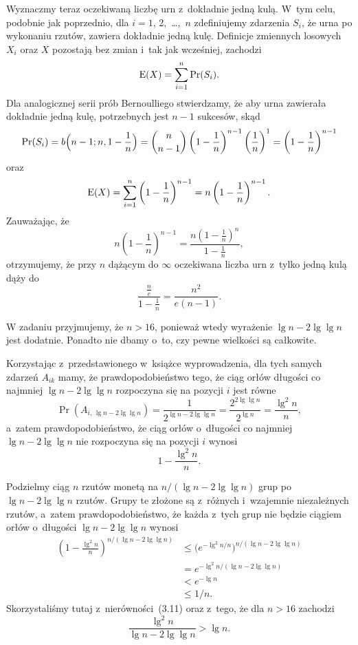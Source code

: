 Wyznaczmy teraz oczekiwaną liczbę urn z~dokładnie jedną kulą. W~tym celu, podobnie jak poprzednio, dla $i=1$, 2,~\dots,~$n$ zdefiniujemy zdarzenia $S_i$, że  urna po wykonaniu rzutów, zawiera dokładnie jedną kulę. Definicje zmiennych losowych $X_i$ oraz $X$ pozostają bez zmian i~tak jak wcześniej, zachodzi
\[
	\operatorname{E}(X) = \sum_{i=1}^n\Pr(S_i).
\]
Dla analogicznej serii prób Bernoulliego stwierdzamy, że aby  urna zawierała dokładnie jedną kulę, potrzebnych jest $n-1$ sukcesów, skąd
\[
	\Pr(S_i) = b\Bigl(n-1;n,1-\frac{1}{n}\Bigr) = \binom{n}{n-1}\left(1-\frac{1}{n}\right)^{n-1}\left(\frac{1}{n}\right)^1 = \left(1-\frac{1}{n}\right)^{n-1}
\]
oraz
\[
	\operatorname{E}(X) = \sum_{i=1}^n\left(1-\frac{1}{n}\right)^{n-1} = n\left(1-\frac{1}{n}\right)^{n-1}.
\]
Zauważając, że
\[
	n\left(1-\frac{1}{n}\right)^{n-1} = \frac{n\left(1-\frac{1}{n}\right)^n}{1-\frac{1}{n}},
\]
otrzymujemy, że przy $n$ dążącym do $\infty$ oczekiwana liczba urn z~tylko jedną kulą dąży do
\[
	\frac{\frac{n}{e}}{1-\frac{1}{n}} = \frac{n^2}{e(n-1)}.
\]

\exercise %
W zadaniu przyjmujemy, że $n>16$, ponieważ wtedy wyrażenie $\lg n-2\lg\lg n$ jest dodatnie. Ponadto nie dbamy o~to, czy pewne wielkości są całkowite.

Korzystając z~przedstawionego w~książce wyprowadzenia, dla tych samych zdarzeń $A_{ik}$ mamy, że prawdopodobieństwo tego, że ciąg orłów długości co najmniej $\lg n-2\lg\lg n$ rozpoczyna się na pozycji $i$ jest równe
\[
	\Pr(A_{i,\,\lg n-2\lg\lg n}) = \frac{1}{2^{\lg n-2\lg\lg n}} = \frac{2^{2\lg\lg n}}{2^{\lg n}} = \frac{\lg^2n}{n},
\]
a~zatem prawdopodobieństwo, że ciąg orłów o~długości co najmniej $\lg n-2\lg\lg n$ nie rozpoczyna się na pozycji $i$ wynosi
\[
	1-\frac{\lg^2n}{n}.
\]

Podzielmy ciąg $n$ rzutów monetą na $n/(\lg n-2\lg\lg n)$ grup po $\lg n-2\lg\lg n$ rzutów. Grupy te złożone są z~różnych i~wzajemnie niezależnych rzutów, a~zatem prawdopodobieństwo, że każda z~tych grup nie będzie ciągiem orłów o~długości $\lg n-2\lg\lg n$ wynosi
\begin{align*}
	\left(1-\frac{\lg^2n}{n}\right)^{n/(\lg n-2\lg\lg n)} &\le \bigl(e^{-\lg^2n/n}\bigr)^{n/(\lg n-2\lg\lg n)} \\
	&= e^{-\lg^2n/(\lg n-2\lg\lg n)} \\
	&< e^{-\lg n} \\
	&\le 1/n.
\end{align*}
Skorzystaliśmy tutaj z~nierówności~(3.11) oraz z~tego, że dla $n>16$ zachodzi
\[
	\frac{\lg^2n}{\lg n-2\lg\lg n} > \lg n.
\]

